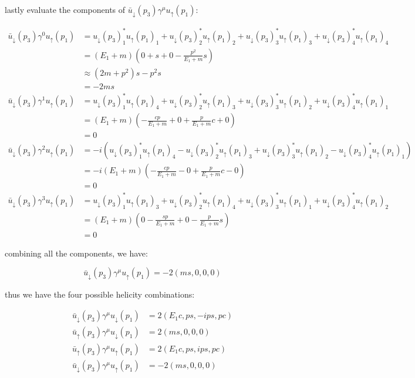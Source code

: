 \documentclass[11pt]{article}
\theoremstyle{definition}
\begin{document}
lastly evaluate the components of $\bar{u}_{\downarrow}(p_3)\gamma^{\mu}u_{\uparrow}(p_1)$:

\begin{align}
    \bar{u}_{\downarrow}(p_3)\gamma^{0}u_{\uparrow}(p_1)
    &=
    u_{\downarrow}(p_3)_1^*u_{\uparrow}(p_1)_1 + u_{\downarrow}(p_3)_2^*u_{\uparrow}(p_1)_2 + u_{\downarrow}(p_3)_3^*u_{\uparrow}(p_1)_3 + u_{\downarrow}(p_3)_4^*u_{\uparrow}(p_1)_4\\
    &= (E_1+m)\left( 0 + s + 0 - \frac{p^2}{E_1+m}s \right)\\
    &\approx (2m+p^2)s -p^2s\\
    &= -2ms\\
    \bar{u}_{\downarrow}(p_3)\gamma^{1}u_{\uparrow}(p_1)
    &=
    u_{\downarrow}(p_3)_1^*u_{\uparrow}(p_1)_4 + u_{\downarrow}(p_3)_2^*u_{\uparrow}(p_1)_3 + u_{\downarrow}(p_3)_3^*u_{\uparrow}(p_1)_2 + u_{\downarrow}(p_3)_4^*u_{\uparrow}(p_1)_1\\
    &= (E_1+m) \left( -\frac{cp}{E_1+m} + 0 + \frac{p}{E_1+m}c + 0 \right)\\
    &= 0\\
    \bar{u}_{\downarrow}(p_3)\gamma^{2}u_{\uparrow}(p_1)
    &=
    -i(u_{\downarrow}(p_3)_1^*u_{\uparrow}(p_1)_4 - u_{\downarrow}(p_3)_2^*u_{\uparrow}(p_1)_3 + u_{\downarrow}(p_3)_3^*u_{\uparrow}(p_1)_2 - u_{\downarrow}(p_3)_4^*u_{\uparrow}(p_1)_1)\\
    &= -i(E_1+m)\left(  -\frac{cp}{E_1+m} - 0 + \frac{p}{E_1+m}c - 0   \right)\\
    &= 0\\
    \bar{u}_{\downarrow}(p_3)\gamma^{3}u_{\uparrow}(p_1)
    &=
    u_{\downarrow}(p_3)_1^*u_{\uparrow}(p_1)_3 + u_{\downarrow}(p_3)_2^*u_{\uparrow}(p_1)_4 + u_{\downarrow}(p_3)_3^*u_{\uparrow}(p_1)_1 + u_{\downarrow}(p_3)_4^*u_{\uparrow}(p_1)_2\\
    &=(E_1+m) \left( 0 -\frac{sp}{E_1+m} + 0 - \frac{p}{E_1+m}s \right)\\
    &= 0
\end{align}

combining all the components, we have:

\begin{equation}
\boxed{
    \bar{u}_{\downarrow}(p_3)\gamma^{\mu}u_{\uparrow}(p_1) = 
        -2(ms, 0, 0, 0)
}
\end{equation}

thus we have the four possible helicity combinations:

\begin{equation*}
    \boxed{
    \begin{aligned}
        \bar{u}_{\downarrow}(p_3)\gamma^{\mu}u_{\downarrow}(p_1) &= 
        2(E_1c, ps, -ips, pc)\\
        \bar{u}_{\uparrow}(p_3)\gamma^{\mu}u_{\downarrow}(p_1) &= 
        2(ms, 0, 0, 0)\\
        \bar{u}_{\uparrow}(p_3)\gamma^{\mu}u_{\uparrow}(p_1) &= 
        2(E_1c, ps, ips, pc)\\
        \bar{u}_{\downarrow}(p_3)\gamma^{\mu}u_{\uparrow}(p_1) &= 
        -2(ms, 0, 0, 0)
    \end{aligned}
    }
 \end{equation*}
\end{document}
